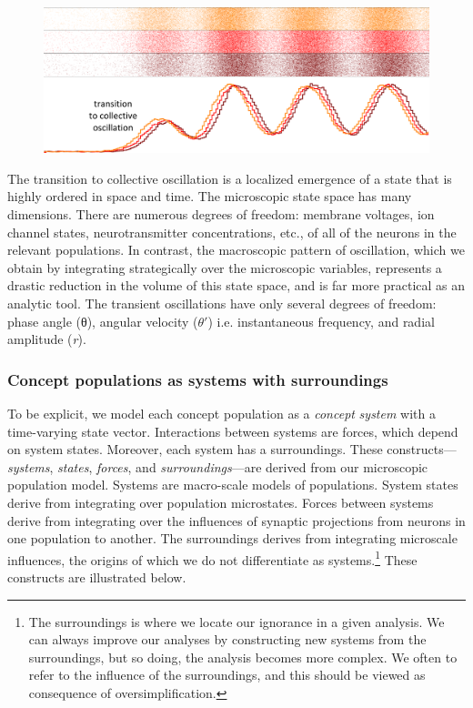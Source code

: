   
\begin{figure}
\includegraphics[width=\textwidth]{figures/Tilsen-img10.png}
\caption{\missingcaption}
\label{fig:}
\end{figure}
 

  The transition to collective oscillation is a localized emergence of a state that is highly ordered in space and time. The microscopic state space has many dimensions. There are numerous degrees of freedom: membrane voltages, ion channel states, neurotransmitter concentrations, etc., of all of the neurons in the relevant populations. In contrast, the macroscopic pattern of oscillation, which we obtain by integrating strategically over the microscopic variables, represents a drastic reduction in the volume of this state space, and is far more practical as an analytic tool. The transient oscillations have only several degrees of freedom: phase angle (θ), angular velocity ($\theta ′$) i.e. instantaneous frequency, and radial amplitude (\textit{r}).

\subsubsection{{\textbf{Concept populations as systems with surroundings}}} 

To be explicit, we model each concept population as a \textit{concept} \textit{system} with a time-varying state vector. Interactions between systems are forces, which depend on system states. Moreover, each system has a surroundings. These constructs—\textit{systems}, \textit{states}, \textit{forces}, and \textit{surroundings}—are derived from our microscopic population model. Systems are macro-scale models of populations. System states derive from integrating over population microstates. Forces between systems derive from integrating over the influences of synaptic projections from neurons in one population to another. The surroundings derives from integrating microscale influences, the origins of which we do not differentiate as systems.\footnote{The surroundings is where we locate our ignorance in a given analysis. We can always improve our analyses by constructing new systems from the surroundings, but so doing, the analysis becomes more complex. We often to refer to the influence of the surroundings, and this should be viewed as consequence of oversimplification.} These constructs are illustrated below.

